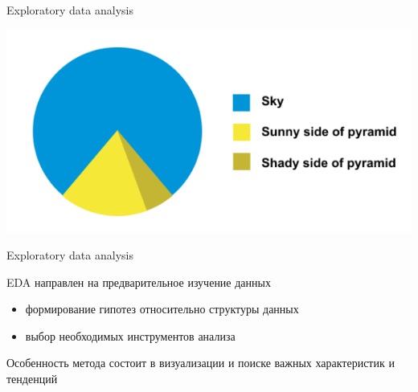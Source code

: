 \documentclass[aspectratio=169]{beamer}
\begin{document}
\begin{frame}{}

\begin{center}
{\LARGE Exploratory data analysis}

\vspace{2em}
\includegraphics[scale=0.4]{images/piechart.png}
\end{center}

\end{frame}

\begin{frame}{Exploratory data analysis}

EDA направлен на предварительное изучение данных
\begin{itemize}
\item формирование гипотез относительно структуры данных
\item выбор необходимых инструментов анализа
\end{itemize}
Особенность метода состоит в визуализации и поиске важных характеристик и тенденций

\end{frame}
\end{document}
